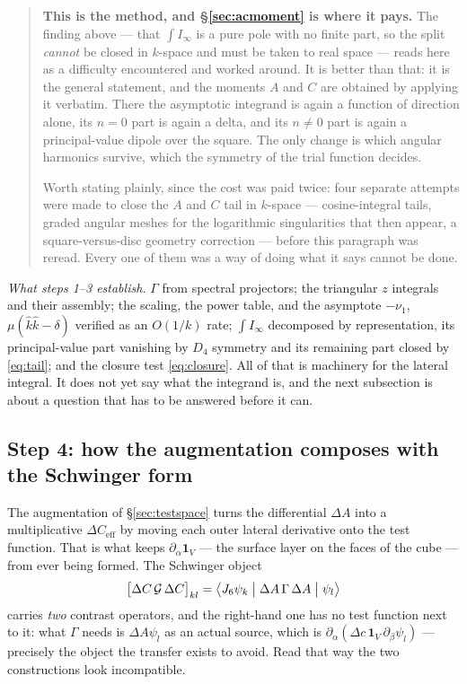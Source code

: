 \documentclass[11pt,a4paper]{article}
\begin{document}
\begin{quote}
\textbf{This is the method, and \S\ref{sec:acmoment} is where it pays.}  The
finding above --- that $\int I_\infty$ is a pure pole with no finite part, so the
split \emph{cannot} be closed in $k$-space and must be taken to real space ---
reads here as a difficulty encountered and worked around.  It is better than
that: it is the general statement, and the moments $A$ and $C$ are obtained by
applying it verbatim.  There the asymptotic integrand is again a function of
direction alone, its $n=0$ part is again a delta, and its $n\neq0$ part is again
a principal-value dipole over the square.  The only change is which angular
harmonics survive, which the symmetry of the trial function decides.

Worth stating plainly, since the cost was paid twice: four separate attempts were
made to close the $A$ and $C$ tail in $k$-space --- cosine-integral tails, graded
angular meshes for the logarithmic singularities that then appear, a
square-versus-disc geometry correction --- before this paragraph was reread.
Every one of them was a way of doing what it says cannot be done.
\end{quote}

\emph{What steps 1--3 establish.}  $\Gamma$ from spectral projectors; the
triangular $z$ integrals and their assembly; the scaling, the power table, and
the asymptote $-\nu_1$, $\mu(\hat{k}\hat{k}-\delta)$ verified as an $O(1/k)$
rate; $\int I_\infty$ decomposed by representation, its principal-value part
vanishing by $D_4$ symmetry and its remaining part closed by \eqref{eq:tail};
and the closure test \eqref{eq:closure}.  All of that is machinery for the
lateral integral.  It does not yet say what the integrand is, and the next
subsection is about a question that has to be answered before it can.

\subsection{Step 4: how the augmentation composes with the Schwinger
form}\label{sec:schwinger}

The augmentation of \S\ref{sec:testspace} turns the differential $\Delta A$ into
a multiplicative $\Delta C_{\text{eff}}$ by moving each outer lateral derivative
onto the test function.  That is what keeps $\partial_\alpha \mathbf{1}_V$ ---
the surface layer on the faces of the cube --- from ever being formed.  The
Schwinger object
\begin{equation}\label{eq:schwinger}
  \bigl[\Delta C\,\mathcal{G}\,\Delta C\bigr]_{kl}
  = \bigl\langle J_6\psi_k \bigm| \Delta A\,\Gamma\,\Delta A \bigm| \psi_l\bigr\rangle
\end{equation}
carries \emph{two} contrast operators, and the right-hand one has no test
function next to it: what $\Gamma$ needs is $\Delta A\psi_l$ as an actual
source, which is $\partial_\alpha(\Delta c\,\mathbf{1}_V\,\partial_\beta\psi_l)$
--- precisely the object the transfer exists to avoid.  Read that way the two
constructions look incompatible.
\end{document}

